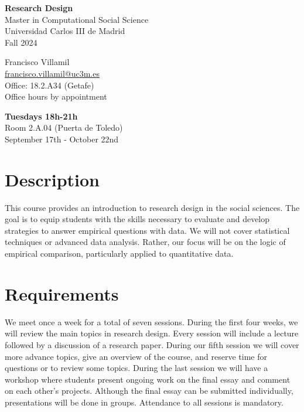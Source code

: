 \documentclass[12pt, a4paper]{article}
\begin{document}
\begin{center}
{\LARGE\bf Research Design}\\\vspace{10pt}
Master in Computational Social Science\\
Universidad Carlos III de Madrid\\\vspace{10pt}
{\large Fall 2024}\\
\end{center}

\vspace{20pt}

\begin{minipage}{0.49\textwidth}
\centering
Francisco Villamil\\
\href{francisco.villamil@uc3m.es}{francisco.villamil@uc3m.es}\\
Office: 18.2.A34 (Getafe)\\
Office hours by appointment
\end{minipage}\hfill
\begin{minipage}{0.49\textwidth}
\centering
\textbf{Tuesdays 18h-21h}\\Room 2.A.04 (Puerta de Toledo)\\September 17th - October 22nd\\
\end{minipage}


\vspace{10pt}
\section{Description}

This course provides an introduction to research design in the social sciences.
The goal is to equip students with the skills necessary to evaluate and develop strategies to answer empirical questions with data.
We will not cover statistical techniques or advanced data analysis.
Rather, our focus will be on the logic of empirical comparison, particularly applied to quantitative data.

\section{Requirements}

We meet once a week for a total of seven sessions. During the first four weeks, we will review the main topics in research design. Every session will include a lecture followed by a discussion of a research paper. During our fifth session we will cover more advance topics, give an overview of the course, and reserve time for questions or to review some topics. During the last session we will have a workshop where students present ongoing work on the final essay and comment on each other's projects. Although the final essay can be submitted individually, presentations will be done in groups. Attendance to all sessions is mandatory.
\end{document}
